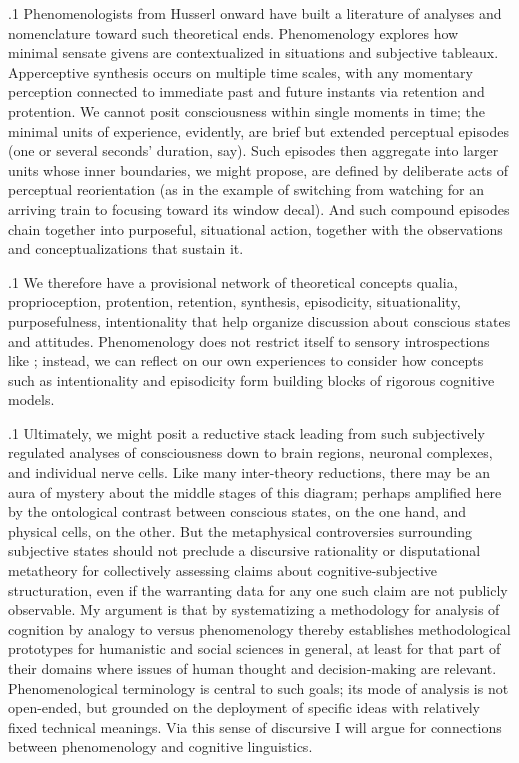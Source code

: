 \documentclass[11pt, twocolumn]{article}
\begin{document}
\p.1{%
Phenomenologists from Husserl onward have built a
literature of analyses and nomenclature toward such
theoretical ends.  Phenomenology explores how minimal sensate
givens are contextualized in situations and subjective
tableaux.  Apperceptive synthesis
occurs on multiple time scales, with any momentary perception
connected to immediate past and future instants via
retention and protention.  We cannot posit
consciousness within single moments in time; the
minimal units of experience, evidently, are brief
but extended perceptual episodes (one or several
seconds' duration, say).  Such episodes then aggregate into
larger units whose inner boundaries, we might propose,
are defined by deliberate acts of perceptual reorientation
(as in the example of switching from watching for an
arriving train to focusing toward its window decal).  And such
compound episodes chain together into purposeful, situational
action, together with the observations and
conceptualizations that sustain it.
} %

\p.1{%
We therefore have a provisional network of theoretical
concepts \mdash{} qualia, proprioception, protention, retention, synthesis,
episodicity, situationality, purposefulness, intentionality
\mdash{} that help organize discussion about conscious states
and attitudes.  Phenomenology
does not restrict itself to sensory introspections
like ;
instead, we can reflect on our own experiences to
consider how concepts such as intentionality and
episodicity form building blocks of rigorous
cognitive models.
} %

\p.1{%
Ultimately, we might posit a reductive stack leading from
such subjectively regulated analyses of consciousness down to
brain regions, neuronal complexes, and individual nerve
cells.  Like many inter-theory reductions, there may be
an aura of mystery about the middle stages of this diagram;
perhaps amplified here by the ontological contrast between
conscious states, on the one hand, and physical cells,
on the other.  But the metaphysical controversies
surrounding subjective states should not preclude
a discursive rationality or disputational metatheory for collectively
assessing claims about cognitive-subjective
structuration, even if the warranting data for
any one such claim are not publicly observable.
My argument is that by systematizing a methodology
for analysis of cognition 
\mdash{} by analogy to  versus 
\mdash{} phenomenology thereby establishes methodological
prototypes for humanistic and social sciences in
general, at least for that part of their
domains where issues of human thought and decision-making
are relevant.  Phenomenological terminology is
central to such goals; its mode of analysis is not
open-ended, but grounded on the deployment of
specific ideas with relatively fixed technical
meanings.  Via this sense of discursive  I
will argue for connections between phenomenology
and cognitive linguistics.
} %
\end{document}
